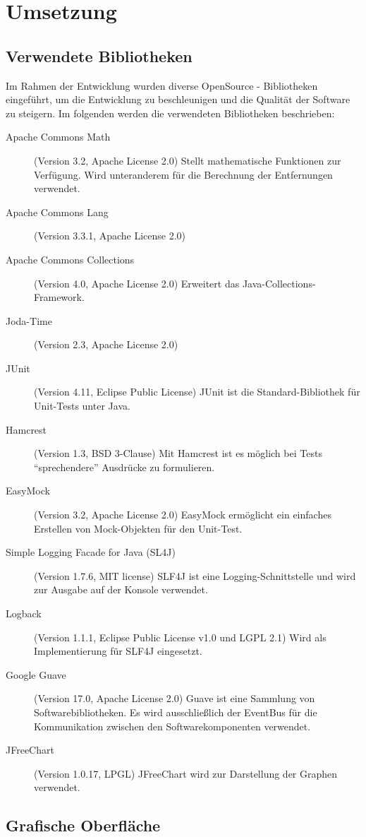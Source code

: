 \section{Umsetzung}

\subsection{Verwendete Bibliotheken}
Im Rahmen der Entwicklung wurden diverse OpenSource - Bibliotheken eingeführt, um die Entwicklung zu beschleunigen und die Qualität der Software zu steigern. Im folgenden werden die verwendeten Bibliotheken beschrieben:
\begin{description}
 \item[Apache Commons Math] (Version 3.2, Apache License 2.0) \cite{apache:CommonsMath} Stellt mathematische Funktionen zur Verfügung. Wird unteranderem für die Berechnung der Entfernungen verwendet.
 \item[Apache Commons Lang] (Version 3.3.1, Apache License 2.0) \cite{apache:CommonsLang} %
 \item[Apache Commons Collections] (Version 4.0, Apache License 2.0) \cite{apache:CommonsCollection} Erweitert das Java-Collec\-tions-Framework. 
 \item[Joda-Time] (Version 2.3, Apache License 2.0) \cite{joda:jodatime} %
 \item[JUnit] (Version 4.11, Eclipse Public License) \cite{junit:junit} JUnit ist die Standard-Bibliothek für Unit-Tests unter Java. 
 \item[Hamcrest] (Version 1.3, BSD 3-Clause) \cite{hamcrest:hamcrest} Mit Hamcrest ist es möglich bei Tests "`sprechendere"' Ausdrücke zu formulieren.
 \item[EasyMock] (Version 3.2, Apache License 2.0) \cite{easymock:easymock} EasyMock ermöglicht ein einfaches Erstellen von Mock-Objekten für den Unit-Test.
 \item[Simple Logging Facade for Java (SL4J)] (Version 1.7.6, MIT license) \cite{qos:slfj} SLF4J ist eine Logging-Schnittstelle und wird zur Ausgabe auf der Konsole verwendet.
 \item[Logback] (Version 1.1.1, Eclipse Public License v1.0 und LGPL 2.1) \cite{qos:logback} Wird als Implementierung für SLF4J eingesetzt.
 \item[Google Guave] (Version 17.0, Apache License 2.0) \cite{google:guave} Guave ist eine Sammlung von Softwarebibliotheken. Es wird ausschließlich der EventBus für die Kommunikation zwischen den Softwarekomponenten verwendet.
 \item[JFreeChart] (Version 1.0.17, LPGL) \cite{ObjectRefineryLimited:JFreeChart} JFreeChart wird zur Darstellung der Graphen verwendet.
\end{description}


\subsection{Grafische Oberfläche}

